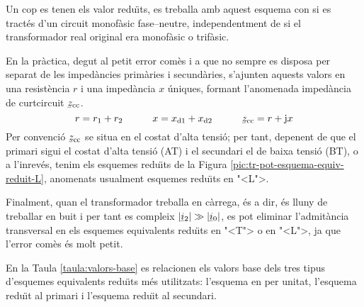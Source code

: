 Un cop es tenen els valor redu\"{\i}ts, es treballa amb aquest esquema con si es tract\'{e}s d'un circuit monof\`{a}sic fase--neutre, independentment de si el transformador real original era monof\`{a}sic o trif\`{a}sic.

En la pr\`{a}ctica, degut al petit error com\`{e}s i a que no sempre es disposa per separat de les imped\`{a}ncies prim\`{a}ries i secund\`{a}ries,  s'ajunten aquests valors en una resist\`{e}ncia $r$ i una  imped\`{a}ncia $x$ \'{u}niques, formant l'anomenada imped\`{a}ncia de curtcircuit $\cmplx{z}\ped{cc}$.
\begin{equation}
    r= r\ped{1}+r\ped{2} \qquad\quad x= x\ped{d1}+x\ped{d2} \qquad\quad \cmplx{z}\ped{cc} = r + \ju x
\end{equation}
Per convenci\'{o} $\cmplx{z}\ped{cc}$ se situa en el costat d'alta tensi\'{o}; per tant, depenent de que el primari  sigui el costat d'alta tensi\'{o} (AT) i el secundari el de baixa tensi\'{o} (BT), o a l'inrev\'{e}s, tenim els esquemes redu\"{\i}ts de la Figura \vref{pic:tr-pot-esquema-equiv-reduit-L}, anomenats usualment esquemes redu\"{\i}ts en {"<}L{">}.  
\begin{center}
    
    \label{pic:tr-pot-esquema-equiv-reduit-L}
\end{center}

\vspace{-4mm}
Finalment, quan el transformador treballa en c\`{a}rrega, \'{e}s a dir, \'{e}s lluny de treballar en buit i per tant es compleix $|\cmplx{i}_2| \gg |\cmplx{i}_0|$, es pot eliminar l'admit\`{a}ncia transversal en els esquemes equivalents redu\"{\i}ts en {"<}T{">} o en {"<}L{">}, ja que l'error com\`{e}s \'{e}s molt petit.

En la  Taula \vref{taula:valors-base} es relacionen els valors base dels tres tipus d'esquemes equivalents redu\"{\i}ts m\'{e}s utilitzats: l'esquema en per unitat, l'esquema redu\"{\i}t al primari i l'esquema redu\"{\i}t al secundari.

